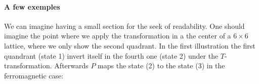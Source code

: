 \documentclass[../main.tex]{main.tex}
\begin{document}
\paragraph{A few exemples}
We can imagine having a small section for the seek of readability. One should imagine the point where we apply the transformation in a the center of a $6\times6$
lattice, where we only show the second quadrant. In the first illustration the first quandrant (state 1) invert itself in the fourth one (state 2) under the $T$-transformation.
Afterwards $P$ maps the state (2) to the state (3)
in the ferromagnetic case:
\begin{figure}[H]
    \centering

\end{figure}
\end{document}
